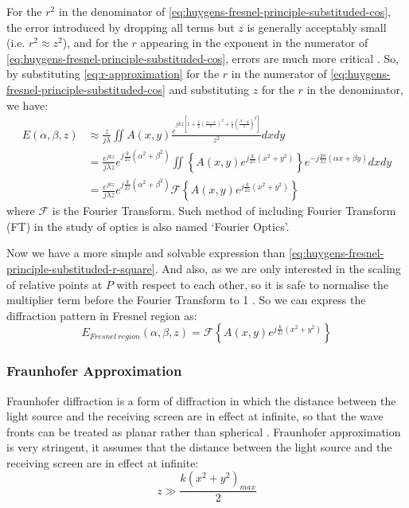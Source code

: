 For the $r^2$ in the denominator of \cref{eq:huygens-fresnel-principle-substituded-cos}, the error introduced by dropping all terms but $z$ is generally acceptably small (i.e. $r^2\approx z^2$), and for the $r$ appearing in the exponent in the numerator of \cref{eq:huygens-fresnel-principle-substituded-cos}, errors are much more critical \cite{Goodman2017}. So, by substituting \cref{eq:r-approximation} for the $r$ in the numerator of \cref{eq:huygens-fresnel-principle-substituded-cos} and substituting $z$ for the $r$ in the denominator, we have:
\begin{align}
  E(\alpha, \beta, z) & \approx \frac{z}{j\lambda} \iint A(x,y)\frac{e^{jkz \left[ 1 + \frac{1}{2} \left( \frac{\alpha-x}{z} \right)^2 + \frac{1}{2} \left(\frac{\beta-y}{z}\right)^2 \right]}}{z^2} dxdy \\
                      & = \frac{e^{jkz}}{j\lambda z} e^{j\frac{k}{2z}(\alpha^2+\beta^2)} \iint \left\{A(x,y)e^{j\frac{k}{2z}(x^2+y^2)}\right\}e^{-j\frac{2\pi}{\lambda z}(\alpha x+\beta y)}dxdy    \\
                      & = \frac{e^{jkz}}{j\lambda z} e^{j\frac{k}{2z}(\alpha^2+\beta^2)} \mathcal{F} \left\{A(x,y)e^{j\frac{k}{2z}(x^2+y^2)}\right\}
\end{align}
where $\mathcal{F}$ is the Fourier Transform. Such method of including Fourier Transform (FT) in the study of optics is also named `Fourier Optics'.

Now we have a more simple and solvable expression than \cref{eq:huygens-fresnel-principle-substituded-r-square}. And also, as we are only interested in the scaling of relative points at $P$ with respect to each other, so it is safe to normalise the multiplier term before the Fourier Transform to 1 \cite{Wilkinson2019}. So we can express the diffraction pattern in Fresnel region as:
\begin{equation}
  E_{Fresnel\ region}(\alpha, \beta, z) = \mathcal{F} \left\{A(x,y)e^{j\frac{k}{2z}(x^2+y^2)}\right\} \label{eq:fresnel-diffraction}
\end{equation}


\subsubsection{Fraunhofer Approximation}
Fraunhofer diffraction is a form of diffraction in which the distance between the light source and the receiving screen are in effect at infinite, so that the wave fronts can be treated as planar rather than spherical \cite{Daintith2009}. Fraunhofer approximation is very stringent, it assumes that the distance between the light source and the receiving screen are in effect at infinite:
\begin{equation}
  z\gg \frac{k(x^2+y^2)_{max}}{2}
\end{equation}

